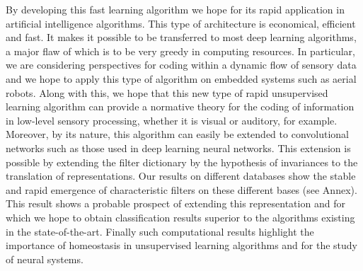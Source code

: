\documentclass[a4paper, 11pt, draft]{article} %
\newcommand{\Acknowledgments}{%
%
This research has received funding from the European Union’s Horizon 2020 research and innovation programme under the Marie Skłodowska-Curie grant agreement No713750. Also, it has been carried out with the financial support of the Regional Council of Provence-Alpes-Côte d’Azur and with the financial support of the A*MIDEX (n° ANR- 11-IDEX-0001-02), funded by the Investissements d'Avenir project funded by the French Government, managed by the French National Research Agency (ANR).
}
\begin{document}
By developing this fast learning algorithm we hope for its rapid application in artificial intelligence algorithms. This type of architecture is economical, efficient and fast. It makes it possible to be transferred to most deep learning algorithms, a major flaw of which is to be very greedy in computing resources. In particular, we are considering perspectives for coding within a dynamic flow of sensory data and we hope to apply this type of algorithm on embedded systems such as aerial robots. Along with this, we hope that this new type of rapid unsupervised learning algorithm can provide a normative theory for the coding of information in low-level sensory processing, whether it is visual or auditory, for example. Moreover, by its nature, this algorithm can easily be extended to convolutional networks such as those used in deep learning neural networks. This extension is possible by extending the filter dictionary by the hypothesis of invariances to the translation of representations. Our results on different databases show the stable and rapid emergence of characteristic filters on these different bases (see Annex). This result shows a probable prospect of extending this representation and for which we hope to obtain classification results superior to the algorithms existing in the state-of-the-art. Finally such computational results highlight the importance of homeostasis in unsupervised learning algorithms and for the study of neural systems.

\printbibliography
\end{document}
